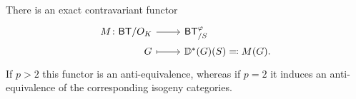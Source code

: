 \begin{prop}\label{prop:A6Kisin}
	There is an exact contravariant functor
	\begin{equation*}
	\begin{tikzcd}[row sep = 0ex
		,/tikz/column 1/.append style={anchor=base east}
		,/tikz/column 2/.append style={anchor=base west}]
		M\colon \mathsf{BT}/O_{ K } \arrow[r, "", rightarrow] &
		\mathsf{BT}^{\varphi}_{/S} \\
		G \arrow[r, "", mapsto] & 
		\mathbb{D}^*(G)(S) \eqqcolon M(G)
	.\end{tikzcd}
	\end{equation*} 
	If $p > 2$ this functor is an anti-equivalence,
	whereas if $p = 2$ it induces an anti-equivalence of the 
	corresponding isogeny categories.
\end{prop}
